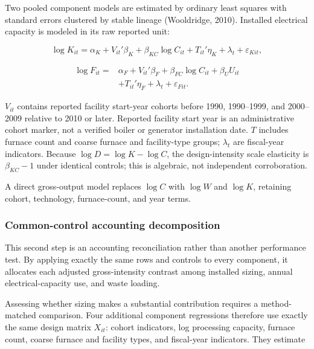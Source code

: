 \documentclass[12pt,a4paper]{article}
\begin{document}
Two pooled component models are estimated by ordinary least squares with
standard errors clustered by stable lineage (Wooldridge, 2010). Installed
electrical capacity is modeled in its raw reported unit:

\begin{equation}
\log K_{it}=\alpha_K+V_{it}'\beta_K
+\beta_{KC}\log C_{it}+T_{it}'\eta_K
+\lambda_t+\varepsilon_{Kit},
\label{eq:design-model}
\end{equation}

\begin{equation}
\begin{split}
\log F_{it}={}&\alpha_F+V_{it}'\beta_F
+\beta_{FC}\log C_{it}+\beta_U U_{it}\\
&+T_{it}'\eta_F+\lambda_t+\varepsilon_{Fit}.
\end{split}
\label{eq:factor-model}
\end{equation}

$V_{it}$ contains reported facility start-year cohorts before 1990,
1990--1999, and 2000--2009 relative to 2010 or later. Reported facility start
year is an administrative cohort marker, not a verified boiler or generator
installation date. $T$ includes furnace count and coarse furnace and
facility-type groups; $\lambda_t$ are fiscal-year indicators. Because
$\log D=\log K-\log C$, the design-intensity scale elasticity is
$\beta_{KC}-1$ under identical controls; this is algebraic, not independent
corroboration.

A direct gross-output model replaces $\log C$ with $\log W$ and $\log K$,
retaining cohort, technology, furnace-count, and year terms.

\subsubsection{Common-control accounting decomposition}

This second step is an accounting reconciliation rather than another
performance test. By applying exactly the same rows and controls to every
component, it allocates each adjusted gross-intensity contrast among installed
sizing, annual electrical-capacity use, and waste loading.

Assessing whether sizing makes a substantial contribution requires a
method-matched comparison. Four additional
component regressions therefore use exactly the same design matrix $X_{it}$:
cohort indicators, log processing capacity, furnace count, coarse furnace and
facility types, and fiscal-year indicators. They estimate
\end{document}
